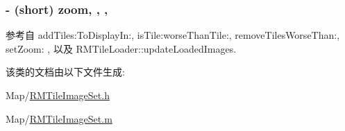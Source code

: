 \hypertarget{interface_r_m_tile_image_set_a87c4fd7a829461f1de0b9a7dce4f68ad}{
\subsubsection[{zoom}]{\setlength{\rightskip}{0pt plus 5cm}-\/ (short) zoom\hspace{0.3cm}{\ttfamily [read]}, {\ttfamily [write]}, {\ttfamily [atomic]}, {\ttfamily [assign]}}}\label{interface_r_m_tile_image_set_a87c4fd7a829461f1de0b9a7dce4f68ad}


参考自 add\-Tiles\-:\-To\-Display\-In\-:, is\-Tile\-:worse\-Than\-Tile\-:, remove\-Tiles\-Worse\-Than\-:, set\-Zoom\-: , 以及 R\-M\-Tile\-Loader\-::update\-Loaded\-Images.



该类的文档由以下文件生成\-:\begin{DoxyCompactItemize}
\item 
Map/\hyperlink{_r_m_tile_image_set_8h}{R\-M\-Tile\-Image\-Set.\-h}\item 
Map/\hyperlink{_r_m_tile_image_set_8m}{R\-M\-Tile\-Image\-Set.\-m}\end{DoxyCompactItemize}
